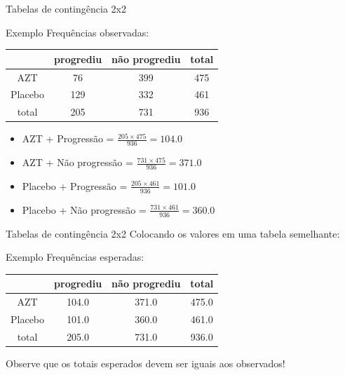 \documentclass{beamer}
\begin{document}
\begin{frame}{\scriptsize Tabelas de contingência 2x2}
  \begin{exampleblock}{Exemplo}
    \footnotesize
    Frequências observadas:
    \begin{tabular}{c|c|c|c}
      & progrediu & não progrediu & total\\
      \hline
      AZT & 76 & 399 & 475\\
      \hline
      Placebo & 129 & 332 & 461\\
      \hline
      total & 205 & 731 & 936\\
    \end{tabular}
  \end{exampleblock}
  \vfill
  \begin{itemize}
    \scriptsize
  \item AZT + Progressão = $\frac{205 \times 475}{936} = 104.0$
  \item AZT + Não progressão = $\frac{731 \times 475}{936} = 371.0$
  \item Placebo + Progressão = $\frac{205 \times 461}{936} = 101.0$
  \item Placebo + Não progressão = $\frac{731 \times 461}{936} = 360.0$
  \end{itemize}
\end{frame}

\begin{frame}{\scriptsize Tabelas de contingência 2x2}
Colocando os valores em uma tabela semelhante:
  \begin{exampleblock}{Exemplo}
    \footnotesize
    Frequências esperadas:
    \begin{tabular}{c|c|c|c}
      & progrediu & não progrediu & total\\
      \hline
      AZT & 104.0 & 371.0 & 475.0\\
      \hline
      Placebo & 101.0 & 360.0 & 461.0\\
      \hline
      total & 205.0 & 731.0 & 936.0\\
    \end{tabular}
  \end{exampleblock}
Observe que os totais esperados devem ser iguais aos observados!
\end{frame}
\end{document}
